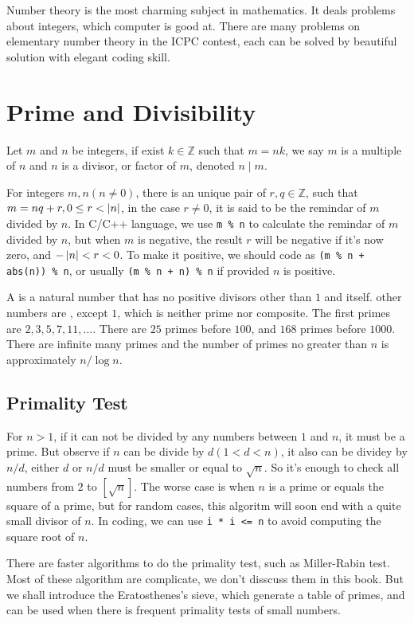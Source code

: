 Number theory is the most charming subject in mathematics.
It deals problems about integers, which computer is good at.
There are many problems on elementary number theory in the ICPC contest,
each can be solved by beautiful solution with elegant coding skill.

\section{Prime and Divisibility}
Let $m$ and $n$ be integers, if exist $k\in \mathbb{Z}$ such that $m=nk$,
we say $m$ is a multiple of $n$ and $n$ is a divisor, or factor of $m$, denoted $n\mid m$.

For integers $m, n(n\neq 0)$, there is an unique pair of $r, q \in \mathbb{Z}$,
such that $m=nq+r, 0 \leq r < \left| {n} \right|$, in the case $r\neq 0$,
it is said to be the remindar of $m$ divided by $n$.
In C/C++ language, we use \verb|m % n| to calculate the remindar of $m$ divided by $n$,
but when $m$ is negative, the result $r$ will be negative if it's now zero, and $-\left| {n} \right| < r < 0$.
To make it positive, we should code as \verb|(m % n + abs(n)) % n|,
or usually \verb|(m % n + n) % n| if provided $n$ is positive.

A  is a natural number that has no positive divisors other than $1$ and itself.
other numbers are , except $1$, which is neither prime nor composite.
The first primes are $2, 3, 5, 7, 11, \dots$. There are $25$ primes before $100$, and $168$ primes before $1000$.
There are infinite many primes and the number of primes no greater than $n$ is approximately $n / \log n$.

\subsection{Primality Test}
For $n > 1$, if it can not be divided by any numbers between $1$ and $n$, it must be a prime.
But observe if $n$ can be divide by $d(1 < d < n)$, it also can be dividey by $n / d$,
either $d$ or $n / d$ must be smaller or equal to $\sqrt{n}$.
So it's enough to check all numbers from $2$ to $\left[\sqrt{n}\right]$.
The worse case is when $n$ is a prime or equals the square of a prime,
but for random cases, this algoritm will soon end with a quite small divisor of $n$.
In coding, we can use \verb|i * i <= n| to avoid computing the square root of $n$.


There are faster algorithms to do the primality test, such as Miller-Rabin test.
Most of these algorithm are complicate, we don't disscuss them in this book.
But we shall introduce the Eratosthenes's sieve, which generate a table of primes,
and can be used when there is frequent primality tests of small numbers.


